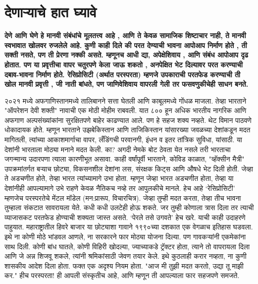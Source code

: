 \chapter{देणाऱ्याचे हात घ्यावे}

\textcolor{blue!60!black}{\textbf{देणे आणि घेणे हे मानवी संबंधांचे मूलतत्त्व आहे , आणि ते केवळ सामाजिक शिष्टाचार नाही, ते मानवी स्वभावात खोलवर रुजलेले आहे. कुणी काही दिले की परत देण्याची भावना आपोआप निर्माण होते , ती सक्ती नसते, पण ती प्रेरणा नक्की असते. म्हणूनच आधी द्या, अपेक्षेशिवाय , आणि संबंध आपोआप दृढ होतात. पण या प्रवृत्तीचा वापर चतुरपणे केला जाऊ शकतो , अनपेक्षित भेट दिल्यावर परत करण्याची दबाव-भावना निर्माण होते. रेसिप्रोसिटी (अर्थात परस्परता) म्हणजे उपकाराची परतफेड करण्याची ती खोल मानवी प्रवृत्ती , जी नाती बांधते, पण जाणिवेशिवाय वापरली गेली तर फसवणुकीचेही साधन बनते.}}

२०२१ मध्ये अफगाणिस्तानमध्ये तालिबानने सत्ता घेतली आणि काबूलमध्ये गोंधळ माजला. तेव्हा भारताने "ऑपरेशन देवी शक्ती" नावाची एक मोठी मोहीम राबवली. यात ८०० हून अधिक भारतीय नागरिक आणि अफगाण अल्पसंख्यांकांना सुरक्षितपणे बाहेर काढण्यात आले. पण हे सहज शक्य नव्हते. थेट विमान पाठवणे धोकादायक होते. म्हणून भारताने उझबेकिस्तान आणि ताजिकिस्तान यांसारख्या जवळच्या देशांकडून मदत मागितली, त्यांच्या आकाशमार्गाचा वापर, लँडिंगची परवानगी, इंधन व इतर तांत्रिक सुविधा, यांसाठी. या देशांनी भारताला मोठ्या मनाने मदत केली. का? अगदी नेमके बोट ठेवता येत नसले तरी भारताचा जगन्मान्य उदारपणा त्याला कारणीभूत असावा. काही वर्षांपूर्वी भारताने, कोविड काळात, "व्हॅक्सीन मैत्री" उपक्रमांतर्गत बऱ्याच छोट्या, विकसनशील देशांना लस, संरक्षक किट्स आणि औषधे भेट दिली होती. जेव्हा ते अडचणीत होते, तेव्हा भारत त्यांच्यामागे उभा होता. म्हणून जेव्हा भारत अडचणीत होता, तेव्हा या देशांनीही आपल्यामागे उभे राहणे केवळ नैतिकच नव्हे तर आपुलकीचे मानले. हेच आहे ‘रेसिप्रोसिटी’ म्हणजेच परस्परतेचे मेंटल मॉडेल (मन:प्रारूप, विचारचित्र). जेव्हा तुम्ही मदत करता, तेव्हा तीच भावना तुम्हाला संकटात सावरायला येते. कधी कधी उलटेही होऊ शकते. जर तुम्ही कोणाला त्रास दिला तर त्याची व्याजासकट परतफेड होण्याची शक्यता जास्त असते. ‘पेरले तसे उगवते’ हेच खरे. याची काही उदाहरणे पाहुयात.
महाराष्ट्रातील हिवरे बाजार या छोट्याशा गावाने १९९०च्या दशकात एक वेगळाच इतिहास घडवला. इथे ना कोणी मोठे भांडवल आणले, ना सरकारने फार मोठ्या योजना दिल्या. पण गावकऱ्यांनी एकमेकांना साथ दिली. कोणी बांध घातले, कोणी विहिरी खोदल्या, ज्याच्याकडे ट्रॅक्टर होता, त्याने तो वापरायला दिला आणि जे अन्न शिजवू शकले, त्यांनी श्रमिकांसाठी जेवण तयार केले. इथे कुठलाही करार नव्हता, ना कुणी शासकीय आदेश दिला होता. फक्त एक अदृश्य नियम होता. "आज मी तुझी मदत करतो, उद्या तू माझी कर." हीच परस्परता! ही आपली संस्कृतीच आहे, आणि म्हणून ती आपल्याला फार सहजपणे समजते.
